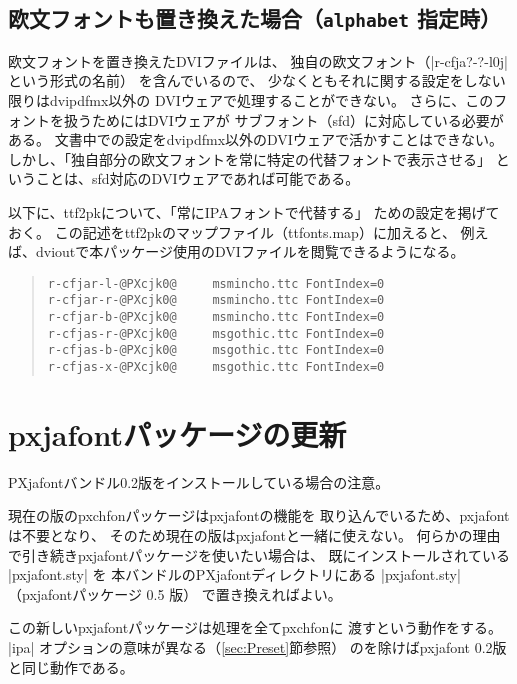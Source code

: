 \documentclass[a4paper,uplatex]{jsarticle}
\newcommand{\Pkg}[1]{\textsf{#1}}
\begin{document}
\subsection{欧文フォントも置き換えた場合（\texttt{alphabet} 指定時）}

欧文フォントを置き換えたDVIファイルは、
独自の欧文フォント（|r-cfja?-?-l0j| という形式の名前）
を含んでいるので、
少なくともそれに関する設定をしない限りはdvipdfmx以外の
DVIウェアで処理することができない。
さらに、このフォントを扱うためにはDVIウェアが
サブフォント（sfd）に対応している必要がある。
文書中での設定をdvipdfmx以外のDVIウェアで活かすことはできない。
しかし、「独自部分の欧文フォントを常に特定の代替フォントで表示させる」
ということは、sfd対応のDVIウェアであれば可能である。

以下に、ttf2pkについて、「常にIPAフォントで代替する」
ための設定を掲げておく。
この記述をttf2pkのマップファイル（ttfonts.map）に加えると、
例えば、dvioutで本パッケージ使用のDVIファイルを閲覧できるようになる。

\begin{quote}\small\begin{verbatim}
r-cfjar-l-@PXcjk0@     msmincho.ttc FontIndex=0
r-cfjar-r-@PXcjk0@     msmincho.ttc FontIndex=0
r-cfjar-b-@PXcjk0@     msmincho.ttc FontIndex=0
r-cfjas-r-@PXcjk0@     msgothic.ttc FontIndex=0
r-cfjas-b-@PXcjk0@     msgothic.ttc FontIndex=0
r-cfjas-x-@PXcjk0@     msgothic.ttc FontIndex=0
\end{verbatim}\end{quote}

\section{pxjafontパッケージの更新}

{\sffamily
\Pkg{PXjafont}バンドル0.2版をインストールしている場合の注意。}

現在の版の\Pkg{pxchfon}パッケージは\Pkg{pxjafont}の機能を
取り込んでいるため、\Pkg{pxjafont}は不要となり、
そのため現在の版は\Pkg{pxjafont}と一緒に使えない。
何らかの理由で引き続き\Pkg{pxjafont}パッケージを使いたい場合は、
既にインストールされている |pxjafont.sty| を
本バンドルの\Pkg{PXjafont}ディレクトリにある %
|pxjafont.sty|（\Pkg{pxjafont}パッケージ 0.5 版）
で置き換えればよい。

この新しい\Pkg{pxjafont}パッケージは処理を全て\Pkg{pxchfon}に
渡すという動作をする。
|ipa| オプションの意味が異なる（\ref{sec:Preset}節参照）
のを除けば\Pkg{pxjafont} 0.2版と同じ動作である。
\end{document}

